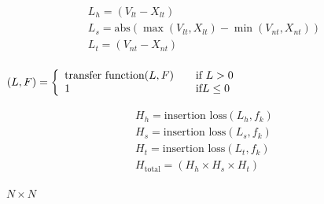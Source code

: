 {
{\newpage\clearpage
{}%
\begin{displaymath}\begin{array}{l}   L_h=(V_{lt}-X_{lt})\\L_s=\text{abs}(\max(V_{lt},X_{lt})-\min(V_{nt},X_{nt}))\\L_t=(V_{nt}-X_{nt})\\\end{array}\end{displaymath}%
\lthtmldisplayZ
\lthtmlcheckvsize\clearpage}

{\newpage\clearpage
{}%
$\displaystyle (L,F)=\left\{     \begin{array}{l l}       \text{transfer function}(L,F) & \quad \text{if}\  L>0\\1 & \quad \text{if} L\le 0\\\end{array} \right.$%
\lthtmlindisplaymathZ
\lthtmlcheckvsize\clearpage}

{\newpage\clearpage
{}%
\begin{displaymath}\begin{array}{l}   H_h=\text{insertion loss}(L_h,f_k)\\H_s=\text{insertion loss}(L_s,f_k)\\H_t=\text{insertion loss}(L_t,f_k)\\H_{\text{total}}=(H_h \times H_s \times H_t)\\\end{array}\end{displaymath}%
\lthtmldisplayZ
\lthtmlcheckvsize\clearpage}

{\newpage\clearpage
{}%
$ N\times N$%
\lthtmlinlinemathZ
\lthtmlcheckvsize\clearpage}

{\newpage\clearpage
{}%
\begin{figure}  \begin{algorithmic}
      \REPEAT
        \ENDFOR
    \ENDFOR
  \end{algorithmic}
  
\end{figure}%
\lthtmlfigureZ
\lthtmlcheckvsize\clearpage}

{\newpage\clearpage
{}%
\begin{figure}  \begin{algorithmic}
    \REPEAT
        \ENDFOR
      \ENDFOR
  \end{algorithmic}
  

\end{figure}}}
